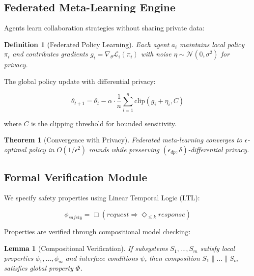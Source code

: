 \documentclass[conference]{IEEEtran}
\newtheorem{theorem}{Theorem}
\newtheorem{lemma}{Lemma}
\newtheorem{definition}{Definition}
\begin{document}


\subsection{Federated Meta-Learning Engine}

Agents learn collaboration strategies without sharing private data:

\begin{definition}[Federated Policy Learning]
Each agent $a_i$ maintains local policy $\pi_i$ and contributes gradients $g_i = \nabla_{\theta} \mathcal{L}_i(\pi_i)$ with noise $\eta \sim \mathcal{N}(0, \sigma^2)$ for privacy.
\end{definition}

The global policy update with differential privacy:

\begin{equation}
\theta_{t+1} = \theta_t - \alpha \cdot \frac{1}{n} \sum_{i=1}^{n} \text{clip}(g_i + \eta_i, C)
\end{equation}

where $C$ is the clipping threshold for bounded sensitivity.

\begin{theorem}[Convergence with Privacy]
Federated meta-learning converges to $\epsilon$-optimal policy in $O(1/\epsilon^2)$ rounds while preserving $(\epsilon_{dp}, \delta)$-differential privacy.
\end{theorem}

\subsection{Formal Verification Module}

We specify safety properties using Linear Temporal Logic (LTL):

\begin{equation}
\phi_{safety} = \Box (request \Rightarrow \Diamond_{≤k} response)
\end{equation}

Properties are verified through compositional model checking:

\begin{lemma}[Compositional Verification]
If subsystems $S_1, ..., S_m$ satisfy local properties $\phi_1, ..., \phi_m$ and interface conditions $\psi$, then composition $S_1 \parallel ... \parallel S_m$ satisfies global property $\Phi$.
\end{lemma}
\end{document}
